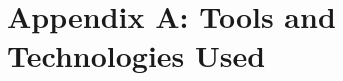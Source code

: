 \documentclass[12pt,a4paper]{report}
\begin{document}
\newpage
{}
\setcounter{page}{1}



\appendix

\chapter{Appendix A: Tools and Technologies Used}
\end{document}
